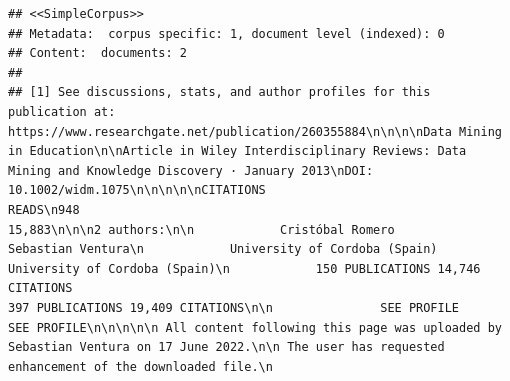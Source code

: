 \documentclass[
]{article}
\begin{document}
\begin{verbatim}
## <<SimpleCorpus>>
## Metadata:  corpus specific: 1, document level (indexed): 0
## Content:  documents: 2
## 
## [1] See discussions, stats, and author profiles for this publication at: https://www.researchgate.net/publication/260355884\n\n\n\nData Mining in Education\n\nArticle in Wiley Interdisciplinary Reviews: Data Mining and Knowledge Discovery · January 2013\nDOI: 10.1002/widm.1075\n\n\n\n\nCITATIONS                                                                                              READS\n948                                                                                                    15,883\n\n\n2 authors:\n\n            Cristóbal Romero                                                                                      Sebastian Ventura\n            University of Cordoba (Spain)                                                                         University of Cordoba (Spain)\n            150 PUBLICATIONS 14,746 CITATIONS                                                                     397 PUBLICATIONS 19,409 CITATIONS\n\n               SEE PROFILE                                                                                           SEE PROFILE\n\n\n\n\n All content following this page was uploaded by Sebastian Ventura on 17 June 2022.\n\n The user has requested enhancement of the downloaded file.\n                                                                                                                                                                                                                                                                                                                                                                                                                                                                                                                                                                                                                                                                                                                                                                                                                                                                                                                                                                                                                                                                                                                                                                                                                                                                                                                                                                                                                                                                                                                                                                                                                                                                                                                                                                                                                                                                                                                                                                           
\end{verbatim}
\end{document}
